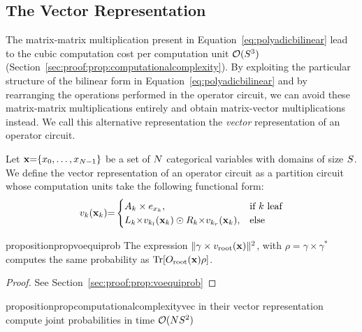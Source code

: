 \subsection{The Vector Representation}
\label{sec:vpoc}

The matrix-matrix multiplication present in Equation~\ref{eq:polyadicbilinear} lead to the cubic computation cost per computation unit $\mathcal{O} (S^3)$ (\cf Section~\ref{sec:proof:prop:computationalcomplexity}). By exploiting the particular structure of the bilinear form in Equation~\ref{eq:polyadicbilinear} and by rearranging the operations performed in the operator circuit, we can avoid these matrix-matrix multiplications entirely and obtain matrix-vector multiplications instead. We call this alternative representation the \textit{vector} representation of an operator circuit.

\begin{definition}
	\label{def:vpoc}
	Let   $\mathbf{x}{=}\{x_0,\dots ,x_{N{-}1}  \}$ be a set of $N$ categorical variables with domains of size $S$.
	We define the vector representation of an operator circuit as a partition circuit whose computation units take the following functional form:
	\begin{align}
		{\ensuremath{v}}_k(\mathbf{x}_k){=}
		\begin{cases}
			A_{k} \times  e_{x_k},
			 & \text{if $k$ leaf}
			\\
			L_k {\times}  v_{k_l} (\mathbf{x}_k)  \odot R_k {\times}  v_{k_r} (\mathbf{x}_k),
			 & \text{else}
		\end{cases}
		\label{eq:vector_units}
	\end{align}
\end{definition}





\begin{restatable}{proposition}{propvoequiprob}
	\label{prop:voequiprob}
	The expression $\lVert \gamma \times v_{\text{root}}(\mathbf{x})\rVert^2$, with $\rho = \gamma \times \gamma^*$ computes the same probability as $\Tr [O_{\text{root}}(\mathbf{x}) \rho]$.
\end{restatable}

\begin{proof}
	See Section~\ref{sec:proof:prop:voequiprob}
\end{proof}

\begin{restatable}{proposition}{propcomputationalcomplexityvec}
	\label{prop:computationalcomplexityvec}
	\puncs in their vector representation compute joint probabilities in time $\mathcal{O}(N S^2)$
\end{restatable}

